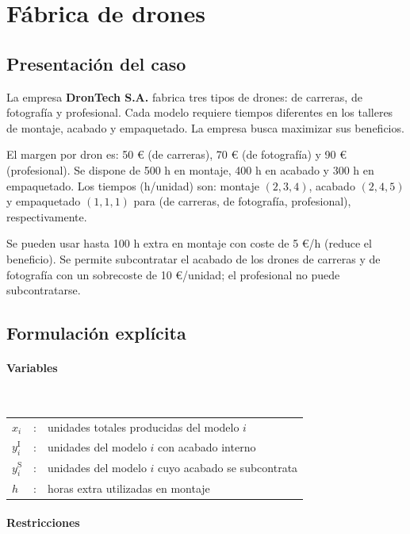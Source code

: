 \section{Fábrica de drones}

\subsection{Presentación del caso}

La empresa \textbf{DronTech S.A.} fabrica tres tipos de drones: de carreras, de fotografía y profesional. Cada modelo requiere tiempos diferentes en los talleres de montaje, acabado y empaquetado. La empresa busca maximizar sus beneficios.

El margen por dron es: 50 € (de carreras), 70 € (de fotografía) y 90 € (profesional). Se dispone de 500 h en montaje, 400 h en acabado y 300 h en empaquetado. Los tiempos (h/unidad) son: montaje \((2,3,4)\), acabado \((2,4,5)\) y empaquetado \((1,1,1)\) para (de carreras, de fotografía, profesional), respectivamente.

Se pueden usar hasta 100 h extra en montaje con coste de 5 €/h (reduce el beneficio). Se permite subcontratar el acabado de los drones de carreras y de fotografía con un sobrecoste de 10 €/unidad; el profesional no puede subcontratarse.


\subsection{Formulación explícita}

\paragraph{Variables}\mbox{}\\

\begin{tabular}{lcl}
$x_i$ & : & unidades totales producidas del modelo $i$ \\
$y_i^{\mathrm{I}}$ & : & unidades del modelo $i$ con acabado interno \\
$y_i^{\mathrm{S}}$ & : & unidades del modelo $i$ cuyo acabado se subcontrata \\
$h$ & : & horas extra utilizadas en montaje \\
\end{tabular}

\paragraph{Restricciones}\mbox{}\\[1mm]

